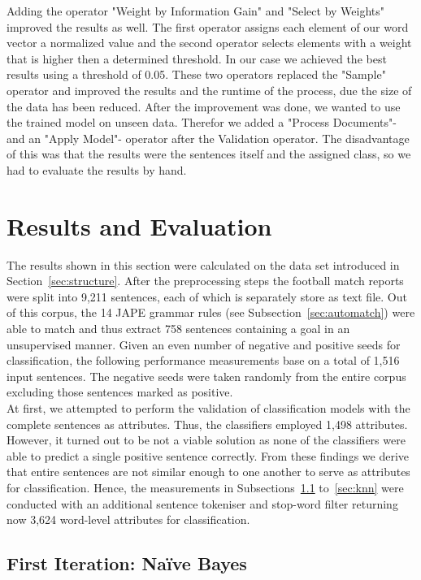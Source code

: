 \documentclass[11pt,titlepage,oneside,openany]{book}
\begin{document}
Adding the operator "Weight by Information Gain" and "Select by Weights" improved the results as well. The first operator assigns each element of our word vector a normalized value and the second operator selects elements with a weight that is higher then a determined threshold. In our case we achieved the best results using a threshold of 0.05. These two operators replaced the "Sample" operator and improved the results and the runtime of the process, due the size of the data has been reduced.
After the improvement was done, we wanted to use the trained model on unseen data. Therefor we added a "Process Documents"- and an "Apply Model"- operator after the Validation operator. The disadvantage of this was that the results were the sentences itself and the assigned class, so we had to evaluate the results by hand. 

\section{Results and Evaluation}
\label{sec:eval}

The results shown in this section were calculated on the data set introduced in Section~\ref{sec:structure}. After the preprocessing steps the football match reports were split into 9,211 sentences, each of which is separately store as text file. Out of this corpus, the 14 JAPE grammar rules (see Subsection~\ref{sec:automatch}) were able to match and thus extract 758 sentences containing a goal in an unsupervised manner. Given an even number of negative and positive seeds for classification, the following performance measurements base on a total of 1,516 input sentences. The negative seeds were taken randomly from the entire corpus excluding those sentences marked as positive.\\
At first, we attempted to perform the validation of classification models with the complete sentences as attributes. Thus, the classifiers employed 1,498 attributes. However, it turned out to be not a viable solution as none of the classifiers were able to predict a single positive sentence correctly. From these findings we derive that entire sentences are not similar enough to one another to serve as attributes for classification. Hence, the measurements in Subsections~\ref{sec:nb} to~\ref{sec:knn} were conducted with an additional sentence tokeniser and stop-word filter returning now 3,624 word-level attributes for classification.

\subsection{First Iteration: Na\"{i}ve Bayes}
\label{sec:nb}
\end{document}
